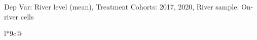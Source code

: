 \begin{table}[H]
\captionlistentry[table]{}
\label{table:beaver_hydrometry_DVlevel_mean_SCg23}
\tiny %
Dep Var: River level (mean), Treatment Cohorts: 2017, 2020, River sample: On-river cells \\
\begin{threeparttable}
\begin{tabulary}{\textwidth}{l*{9}{c}@{}}
\toprule \toprule
\noalign{\smallskip}
\noalign{\smallskip}
\midrule \bottomrule
\end{tabulary}
\medskip
\end{threeparttable}
\end{table}
